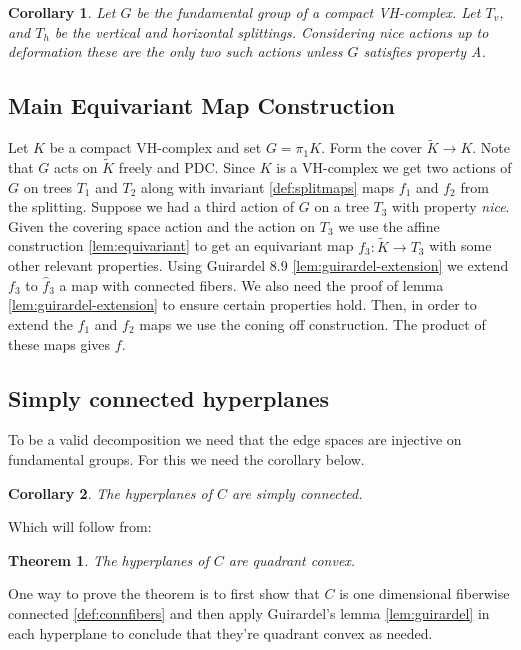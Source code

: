 \documentclass{article}
\theoremstyle{mystyle}
\newtheorem{thm}{Theorem}[section]
\newtheorem*{cor*}{Corollary}
\theoremstyle{remark}
\begin{document}
    \begin{cor*}
            Let \(G\) be the fundamental group of a compact VH-complex. Let \(T_{v}\), and \(T_{h}\) be the vertical and horizontal splittings. Considering {\em nice} actions up to deformation these are the only two such actions unless \(G\) satisfies {\em property A}.
    \end{cor*}


\subsection{Main Equivariant Map Construction}
Let \(K\) be a compact VH-complex and set \(G= \pi_{1} K\). Form the cover \(\widetilde{K} \to K\). Note that \(G\) acts on \(\widetilde K\) freely and PDC. Since \(K\) is a VH-complex we get two actions of \(G\) on trees \(T_{1}\) and \(T_{2}\) along with invariant \ref{def:splitmaps} maps \(f_{1}\) and \(f_{2}\) from the splitting. Suppose we had a third action of \(G\) on a tree \(T_{3}\) with property {\em nice}. Given the covering space action and the action on \(T_{3}\) we use the affine construction \ref{lem:equivariant} to get an equivariant map \(f_{3} : \widetilde K \to T_{3}\) with some other relevant properties. Using Guirardel 8.9 \ref{lem:guirardel-extension} we extend \(f_{3}\) to \(\widehat f_{3}\) a map with connected fibers. We also need the proof of lemma \ref{lem:guirardel-extension} to ensure certain properties hold. Then, in order to extend the \(f_{1}\) and \(f_{2}\) maps we use the coning off construction. The product of these maps gives \(f\).
    
    \subsection{Simply connected hyperplanes}
    To be a valid decomposition we need that the edge spaces are injective on fundamental groups. For this we need the corollary below.
\begin{cor*}
    The hyperplanes of \(C\) are simply connected. 
\end{cor*}

Which will follow from:

\begin{thm}
    The hyperplanes of \(C\) are quadrant convex.    
\end{thm}

One way to prove the theorem is to first show that \(C\) is one dimensional fiberwise connected \ref{def:connfibers} and then apply Guirardel's lemma \ref{lem:guirardel} in each hyperplane to conclude that they're quadrant convex as needed.
\end{document}
